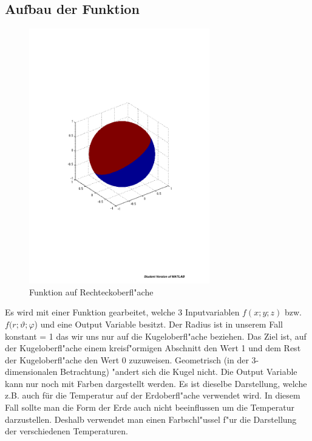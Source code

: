 \begin{refsection}
 
\section{Aufbau der Funktion}

\begin{figure}%
\centering
\includegraphics[width=0.7\textwidth]{kugel/Funktion.pdf}
\caption{Funktion auf Rechteckoberfl"ache
\label{skript:Koordinaten der Kugel}}
\end{figure}

Es wird mit einer Funktion gearbeitet, welche 3 Inputvariablen $f(x;y;z)$ bzw. $f(r;\vartheta;\varphi$) und eine Output Variable besitzt. Der Radius ist in unserem Fall konstant = 1 das wir uns nur auf die Kugeloberfl"ache beziehen. Das Ziel ist, auf der Kugeloberfl"ache einem kreisf"ormigen Abschnitt den Wert 1 und dem Rest der Kugeloberfl"ache den Wert 0 zuzuweisen. Geometrisch (in der 3-dimensionalen Betrachtung) "andert sich die Kugel nicht. Die Output Variable kann nur noch mit Farben dargestellt werden. Es ist dieselbe Darstellung, welche z.B. auch für die Temperatur auf der Erdoberfl"ache verwendet wird. In diesem Fall sollte man die Form der Erde auch nicht beeinflussen um die Temperatur darzustellen. Deshalb verwendet man einen Farbschl"ussel f"ur die Darstellung der verschiedenen Temperaturen.\\


\end{refsection}
